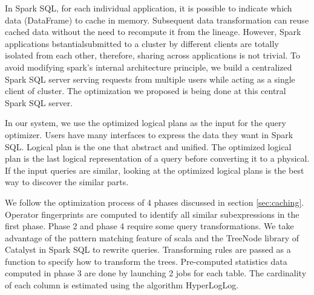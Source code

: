In Spark SQL, for each individual application, it is possible to indicate which data (DataFrame) to cache in memory. Subsequent data transformation can reuse cached data without the need to recompute it from the lineage. However, Spark applications bstantialsubmitted to a cluster by different clients are totally isolated from each other\cite{zaharia2012resilient}, therefore, sharing across applications is not trivial. To avoid modifying spark's internal architecture principle, we build a centralized Spark SQL server serving requests from multiple users while acting as a single client of cluster. The optimization we proposed is being done at this central Spark SQL server.

In our system, we use the optimized logical plans as the input for the query optimizer. Users have many interfaces to express the data they want in Spark SQL. Logical plan is the one that abstract and unified. The optimized logical plan is the last logical representation of a query before converting it to a physical. If the input queries are similar, looking at the optimized logical plans is the best way to discover the similar parts.

We follow the optimization process of 4 phases discussed in section \ref{sec:caching}. Operator fingerprints are computed to identify all similar subexpressions in the first phase. Phase 2 and phase 4 require some query transformations. We take advantage of the pattern matching feature of scala and the TreeNode library of Catalyst in Spark SQL to rewrite queries. Transforming rules are passed as a function to specify how to transform the trees. Pre-computed statistics data computed in phase 3 are done by launching 2 jobs for each table. The cardinality of each column is estimated using the algorithm HyperLogLog.